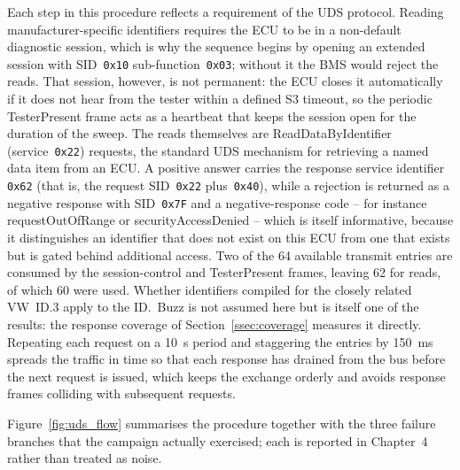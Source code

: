 \documentclass[11pt,a4paper,oneside,parskip=half]{scrreprt}
\providecommand{\hex}{}\renewcommand{\hex}[1]{\texttt{0x#1}}
\begin{document}
Each step in this procedure reflects a requirement of the UDS protocol. Reading manufacturer-specific identifiers requires the ECU to be in a non-default diagnostic session, which is why the sequence begins by opening an extended session with SID~\hex{10} sub-function~\hex{03}; without it the BMS would reject the reads. That session, however, is not permanent: the ECU closes it automatically if it does not hear from the tester within a defined S3 timeout, so the periodic TesterPresent frame acts as a heartbeat that keeps the session open for the duration of the sweep. The reads themselves are ReadDataByIdentifier (service~\hex{22}) requests, the standard UDS mechanism for retrieving a named data item from an ECU. A positive answer carries the response service identifier \hex{62} (that is, the request SID~\hex{22} plus~\hex{40}), while a rejection is returned as a negative response with SID~\hex{7F} and a negative-response code -- for instance requestOutOfRange or securityAccessDenied -- which is itself informative, because it distinguishes an identifier that does not exist on this ECU from one that exists but is gated behind additional access. Two of the 64 available transmit entries are consumed by the session-control and TesterPresent frames, leaving 62 for reads, of which 60 were used. Whether identifiers compiled for the closely related VW~ID.3 apply to the ID.~Buzz is not assumed here but is itself one of the results: the response coverage of Section~\ref{ssec:coverage} measures it directly. Repeating each request on a 10~s period and staggering the entries by 150~ms spreads the traffic in time so that each response has drained from the bus before the next request is issued, which keeps the exchange orderly and avoids response frames colliding with subsequent requests.

Figure~\ref{fig:uds_flow} summarises the procedure together with the three failure branches that the campaign actually exercised; each is reported in Chapter~4 rather than treated as noise.
\end{document}
